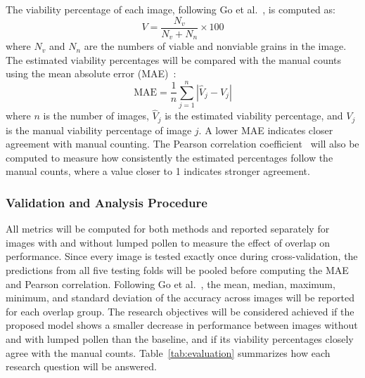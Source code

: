 The viability percentage of each image, following Go et al.~\cite{go2019}, is computed as:
\begin{equation}
    V = \frac{N_v}{N_v + N_n} \times 100
    \label{eq:viability}
\end{equation}
where $N_v$ and $N_n$ are the numbers of viable and nonviable grains in the image. The estimated viability percentages will be compared with the manual counts using the mean absolute error (MAE)~\cite{willmott2005}:
\begin{equation}
    \mathrm{MAE} = \frac{1}{n} \sum_{j=1}^{n} \left| \hat{V}_j - V_j \right|
    \label{eq:mae}
\end{equation}
where $n$ is the number of images, $\hat{V}_j$ is the estimated viability percentage, and $V_j$ is the manual viability percentage of image $j$. A lower MAE indicates closer agreement with manual counting. The Pearson correlation coefficient~\cite{pearson1895} will also be computed to measure how consistently the estimated percentages follow the manual counts, where a value closer to 1 indicates stronger agreement.

\subsubsection{Validation and Analysis Procedure}
\label{sec:m-analysis}

All metrics will be computed for both methods and reported separately for images with and without lumped pollen to measure the effect of overlap on performance. Since every image is tested exactly once during cross-validation, the predictions from all five testing folds will be pooled before computing the MAE and Pearson correlation. Following Go et al.~\cite{go2019}, the mean, median, maximum, minimum, and standard deviation of the accuracy across images will be reported for each overlap group. The research objectives will be considered achieved if the proposed model shows a smaller decrease in performance between images without and with lumped pollen than the baseline, and if its viability percentages closely agree with the manual counts. Table~\ref{tab:evaluation} summarizes how each research question will be answered.

